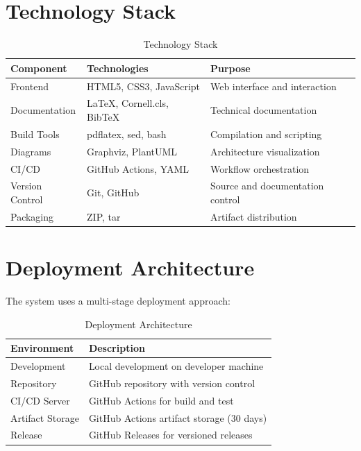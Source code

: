 \section{Technology Stack}
\label{sec:TechStack}

\begin{table}[h]
\centering
\begin{tabular}{|l|l|l|}
\hline
\textbf{Component} & \textbf{Technologies} & \textbf{Purpose} \\
\hline
Frontend & HTML5, CSS3, JavaScript & Web interface and interaction \\
\hline
Documentation & LaTeX, Cornell.cls, BibTeX & Technical documentation \\
\hline
Build Tools & pdflatex, sed, bash & Compilation and scripting \\
\hline
Diagrams & Graphviz, PlantUML & Architecture visualization \\
\hline
CI/CD & GitHub Actions, YAML & Workflow orchestration \\
\hline
Version Control & Git, GitHub & Source and documentation control \\
\hline
Packaging & ZIP, tar & Artifact distribution \\
\hline
\end{tabular}
\caption{Technology Stack}
\label{table:tech-stack}
\end{table}

\section{Deployment Architecture}
\label{sec:DeploymentArch}

The system uses a multi-stage deployment approach:

\begin{table}[h]
\centering
\begin{tabular}{|l|l|}
\hline
\textbf{Environment} & \textbf{Description} \\
\hline
Development & Local development on developer machine \\
\hline
Repository & GitHub repository with version control \\
\hline
CI/CD Server & GitHub Actions for build and test \\
\hline
Artifact Storage & GitHub Actions artifact storage (30 days) \\
\hline
Release & GitHub Releases for versioned releases \\
\hline
\end{tabular}
\caption{Deployment Architecture}
\label{table:deployment-arch}
\end{table}

